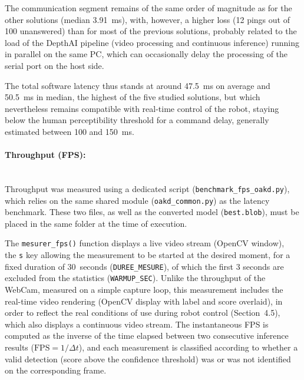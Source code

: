 \documentclass[12pt,a4paper]{report}
\begin{document}
	The communication segment remains of the same order of magnitude as for the other solutions (median 3.91~ms), with, however, a higher loss (12 pings out of 100 unanswered) than for most of the previous solutions, probably related to the load of the DepthAI pipeline (video processing and continuous inference) running in parallel on the same PC, which can occasionally delay the processing of the serial port on the host side.
	
	The total software latency thus stands at around 47.5~ms on average and 50.5~ms in median, the highest of the five studied solutions, but which nevertheless remains compatible with real-time control of the robot, staying below the human perceptibility threshold for a command delay, generally estimated between 100 and 150~ms.
	
	
	\paragraph{Throughput (FPS):} \mbox{} \\
	Throughput was measured using a dedicated script (\texttt{benchmark\_fps\_oakd.py}), which relies on the same shared module (\texttt{oakd\_common.py}) as the latency benchmark. These two files, as well as the converted model (\texttt{best.blob}), must be placed in the same folder at the time of execution.
	
	The \texttt{mesurer\_fps()} function displays a live video stream (OpenCV window), \\ the \texttt{s} key allowing the measurement to be started at the desired moment, for a fixed duration of 30~seconds (\texttt{DUREE\_MESURE}), of which the first 3 seconds are excluded from the statistics (\texttt{WARMUP\_SEC}). Unlike the throughput of the WebCam, measured on a simple capture loop, this measurement includes the real-time video rendering (OpenCV display with label and score overlaid), in order to reflect the real conditions of use during robot control (Section~4.5), which also displays a continuous video stream. The instantaneous FPS is computed as the inverse of the time elapsed between two consecutive inference results ($\text{FPS} = 1/\Delta t$), and each measurement is classified according to whether a valid detection (score above the confidence threshold) was or was not identified on the corresponding frame.
	
\end{document}
